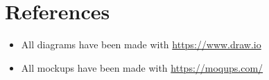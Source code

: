 \chapter{References}
\begin{itemize}
    \item All diagrams have been made with \url{https://www.draw.io}
    \item All mockups have been made with \url{https://moqups.com/}
\end{itemize}
